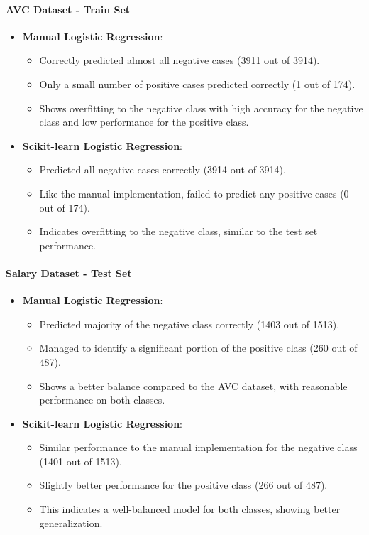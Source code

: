\documentclass[a4paper,12pt]{article}
\begin{document}
\paragraph{AVC Dataset - Train Set}
\begin{itemize}
    \item \textbf{Manual Logistic Regression}:
    \begin{itemize}
        \item Correctly predicted almost all negative cases (3911 out of 3914).
        \item Only a small number of positive cases predicted correctly (1 out of 174).
        \item Shows overfitting to the negative class with high accuracy for the negative class and low performance for the positive class.
    \end{itemize}
    \item \textbf{Scikit-learn Logistic Regression}:
    \begin{itemize}
        \item Predicted all negative cases correctly (3914 out of 3914).
        \item Like the manual implementation, failed to predict any positive cases (0 out of 174).
        \item Indicates overfitting to the negative class, similar to the test set performance.
    \end{itemize}
\end{itemize}

\paragraph{Salary Dataset - Test Set}
\begin{itemize}
    \item \textbf{Manual Logistic Regression}:
    \begin{itemize}
        \item Predicted majority of the negative class correctly (1403 out of 1513).
        \item Managed to identify a significant portion of the positive class (260 out of 487).
        \item Shows a better balance compared to the AVC dataset, with reasonable performance on both classes.
    \end{itemize}
    \item \textbf{Scikit-learn Logistic Regression}:
    \begin{itemize}
        \item Similar performance to the manual implementation for the negative class (1401 out of 1513).
        \item Slightly better performance for the positive class (266 out of 487).
        \item This indicates a well-balanced model for both classes, showing better generalization.
    \end{itemize}
\end{itemize}
\end{document}
